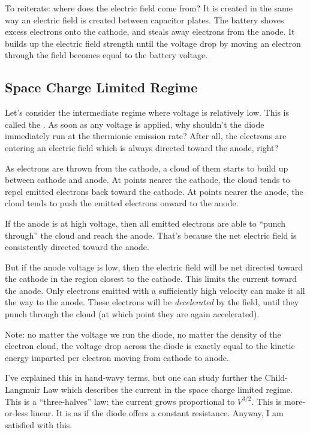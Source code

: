 \documentclass[11pt, oneside]{amsart}
\begin{document}
To reiterate: where does the electric field come from? It is created in
the same way an electric field is created between capacitor plates. The
battery shoves excess electrons onto the cathode, and steals away
electrons from the anode. It builds up the electric field strength until
the voltage drop by moving an electron through the field becomes equal
to the battery voltage.

\subsection{Space Charge Limited Regime}

Let's consider the intermediate regime where voltage is relatively low.
This is called the . As soon as any
voltage is applied, why shouldn't the diode immediately run at the
thermionic emission rate? After all, the electrons are entering an
electric field which is always directed toward the anode, right?

As electrons are thrown from the cathode, a cloud of them starts to
build up between cathode and anode. At points nearer the cathode, the
cloud tends to repel emitted electrons back toward the cathode. At
points nearer the anode, the cloud tends to push the emitted electrons
onward to the anode.

If the anode is at high voltage, then all emitted electrons are able to
``punch through'' the cloud and reach the anode. That's because the net
electric field is consistently directed toward the anode.

But if the anode voltage is low, then the electric field will be net
directed toward the cathode in the region closest to the cathode. This
limits the current toward the anode. Only electrons emitted with a
sufficiently high velocity can make it all the way to the anode. These
electrons will be \emph{decelerated} by the field, until they punch
through the cloud (at which point they are again accelerated).

Note: no matter the voltage we run the diode, no matter the density of
the electron cloud, the voltage drop across the diode is exactly equal
to the kinetic energy imparted per electron moving from cathode to
anode.

I've explained this in hand-wavy terms, but one can study further the
Child-Langmuir Law which describes the current in the space charge
limited regime. This is a ``three-halves'' law: the current grows
proportional to $V^{3/2}$. This is more-or-less linear. It is as if the
diode offers a constant resistance. Anyway, I am satisfied with this.
\end{document}
